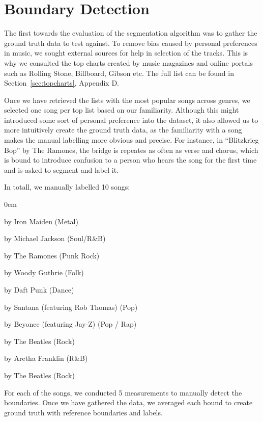 \section{Boundary Detection}

The first towards the evaluation of the segmentation algorithm was to gather the ground truth data to test against. To remove bias caused by personal preferences in music, we sought external sources for help in selection of the tracks. This is why we consulted the top charts created by music magazines and online portals such as Rolling Stone, Billboard, Gibson etc. The full list can be found in Section~\ref{sec:topcharts}, Appendix D.

Once we have retrieved the lists with the most popular songs across genres, we selected one song per top list based on our familiarity. Although this might introduced some sort of personal preference into the dataset, it also allowed us to more intuitively create the ground truth data, as the familiarity with a song makes the manual labelling more obvious and precise. For instance, in ``Blitzkrieg Bop'' by The Ramones, the bridge is repeates as often as verse and chorus, which is bound to introduce confusion to a person who hears the song for the first time and is asked to segment and label it.

In totall, we manually labelled 10 songs:
\vspace{-10pt}
\begin{description}
\itemsep0em 
\item[``The Number of The Beast''] by Iron Maiden (Metal)
\item[``Rock With You''] by Michael Jackson (Soul/R\&B)
\item[``Blitzkrieg Bop''] by The Ramones (Punk Rock)
\item[``This Land is Your Land''] by Woody Guthrie (Folk)
\item[``One More Time''] by Daft Punk (Dance)
\item[``Smooth''] by Santana (featuring Rob Thomas) (Pop)
\item[``Crazy in Love''] by Beyonce (featuring Jay-Z) (Pop / Rap)
\item[``Help!''] by The Beatles (Rock)
\item[``Respect''] by Aretha Franklin (R\&B)
\item[``Back in the USSR''] by The Beatles (Rock)
\end{description}

For each of the songs, we conducted 5 measurements to manually detect the boundaries. Once we have gathered the data, we averaged each bound to create ground truth with reference boundaries and labels.



